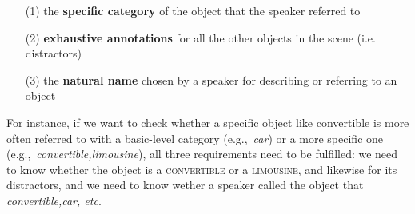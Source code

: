 \documentclass[runningheads]{llncs}
\newcommand{\cs}[1]{\textcolor{PineGreen}{\emph{//cs: #1//}}}
\newcommand{\refexp}[1]{\textsl{#1}}
\newcommand{\cat}[1]{\textsc{#1}}
\begin{document}
\begin{itemize}
    
		\item[(1)] the \textbf{specific category} of the object that the speaker referred to 
		\item[(2)] \textbf{exhaustive annotations} for all the other objects in the scene (i.e. distractors)
		\item[(3)] the \textbf{natural name} chosen by a speaker for describing or referring to an object

\end{itemize}

For instance, if we want to check whether a specific object like convertible is more often referred to with a basic-level category (e.g.,~\refexp{car}) or a more specific one (e.g.,~\refexp{convertible,limousine}), all three requirements need to be fulfilled: we need to know whether the object is a \cat{convertible} or  a \cat{limousine}, and likewise for its distractors, and we need to know wether a speaker called the object that \refexp{convertible,car, etc}.


%
%
\end{document}
